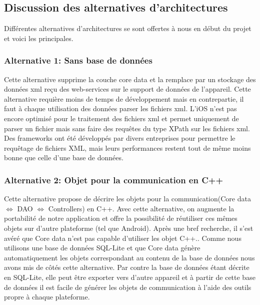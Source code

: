 	\subsection{Discussion des alternatives d'architectures}
		Différentes alternatives d'architectures se sont offertes à nous en début du projet et voici les principales.
		
		\subsubsection{Alternative 1: Sans base de données }
		Cette alternative supprime la couche core data et la remplace par un stockage des données xml reçu des web-services sur le support de données de l'appareil. Cette alternative requière moins de temps de développement mais en contrepartie, il faut à chaque utilisation des données parser les fichiers xml. L'iOS n'est pas encore optimisé pour le traitement des fichiers xml et permet uniquement de parser un fichier mais sans faire des requêtes du type XPath sur les fichiers xml. Des frameworks ont été développés par divers entreprises pour permettre le requêtage de fichiers XML, mais leurs performances restent tout de même moins bonne que celle d'une base de données.
		
		\subsubsection{Alternative 2: Objet pour la communication en C++ }
		Cette alternative propose de décrire les objets pour la communication(Core data \begin{math} \Leftrightarrow \end{math} DAO  \begin{math} \Leftrightarrow \end{math} Controllers) en C++. Avec cette alternative, on augmente la portabilité de notre application et offre la possibilité de réutiliser ces mêmes objets sur d'autre plateforme (tel que Android). Après une bref recherche, il s'est avéré que Core data n'est pas capable d'utiliser les objet C++.. Comme nous utilisons une base de données SQL-Lite et que Core data génère automatiquement les objets correspondant  au contenu de la base de données nous avons mis de côtés cette alternative.  Par contre la base de données étant décrite en SQL-Lite, elle peut être exporter vers d'autre appareil et à partir de cette base de données il est facile de générer les objets de communication à l'aide des outils propre à chaque plateforme.
				
